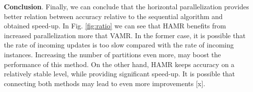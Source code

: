 \documentclass[journal]{IEEEtran}
\begin{document}
\begin{table}[h]
	\captionsetup{name=Tab}
	\caption{Computing time [s] for SAMR and \textbf{speed-up} when running HAMR with different numbers of partitions P.}
	\centering
	\label{tab:time_horizontal}
\end{table}

\medskip
\noindent\textbf{Conclusion}. Finally, we can conclude that the horizontal parallelization provides better relation between accuracy relative to the sequential algorithm and obtained speed-up. In Fig. \ref{fig:ratio} we can see that HAMR benefits from increased parallelization more that VAMR. In the former case, it is possible that the rate of incoming updates is too slow compared with the rate of incoming instances. Increasing the number of partitions even more, may boost the performance of this method. On the other hand, HAMR keeps accuracy on a relatively stable level, while providing significant speed-up. It is possible that connecting both methods may lead to even more improvements [x]. 
\end{document}
